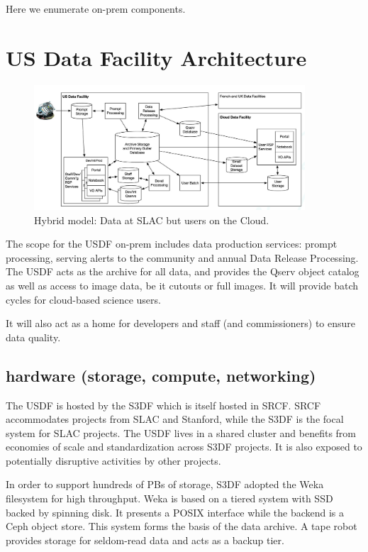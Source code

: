 Here we enumerate on-prem components.
\section {US Data Facility Architecture} \label{sec:usdfarch}


\begin{figure}
\begin{centering}
\includegraphics[width=0.9\textwidth]{hybrid}
	\caption{ Hybrid model: Data at SLAC but users on the Cloud.  \label{fig:usdfarch}}
\end{centering}
\end{figure}

The scope for the USDF on-prem includes data production services:
prompt processing, serving alerts to the community and annual Data
Release Processing. The USDF acts as the archive for all data, and
provides the Qserv object catalog as well as access to image data, be
it cutouts or full images. It will provide batch cycles for cloud-based science users.

It will also act as a home for developers and staff (and
commissioners) to ensure data quality.



\subsection{hardware (storage, compute, networking)}

The USDF is hosted by the S3DF which is itself hosted in SRCF. SRCF
accommodates projects from SLAC and Stanford, while the S3DF is the
focal system for SLAC projects. The USDF lives in a shared cluster and
benefits from economies of scale and standardization across S3DF
projects. It is also exposed to potentially disruptive activities by
other projects.

In order to support hundreds of PBs of storage, S3DF adopted the Weka
filesystem for high throughput. Weka is based on a tiered system with
SSD backed by spinning disk. It presents a POSIX interface while the
backend is a Ceph object store. This system forms the basis of the
data archive. A tape robot provides storage for seldom-read data and
acts as a backup tier.

